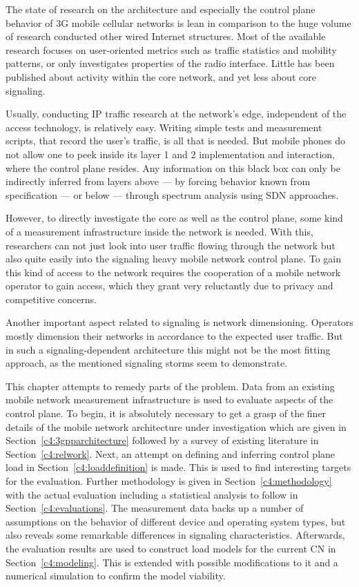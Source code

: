 The state of research on the architecture and especially the control plane behavior of \gls{3G} mobile cellular networks is lean in comparison to the huge volume of research conducted other wired Internet structures. Most of the available research focuses on user-oriented metrics such as traffic statistics and mobility patterns, or only investigates properties of the radio interface. Little has been published about activity within the core network, and yet less about core signaling. 

Usually, conducting \gls{IP} traffic research at the network's edge, independent of the access technology, is relatively easy. Writing simple tests and measurement scripts, that record the user's traffic, is all that is needed. But mobile phones do not allow one to peek inside its layer 1 and 2 implementation and interaction, where the control plane resides. Any information on this black box can only be indirectly inferred from layers above --- by forcing behavior known from specification --- or below --- through spectrum analysis using \gls{SDN} approaches. 

However, to directly investigate the core as well as the control plane, some kind of a measurement infrastructure inside the network is needed. With this, researchers can not just look into user traffic flowing through the network but also quite easily into the signaling heavy mobile network control plane. To gain this kind of access to the network requires the cooperation of a mobile network operator to gain access, which they grant very reluctantly due to privacy and competitive concerns.

Another important aspect related to signaling is network dimensioning. Operators mostly dimension their networks in accordance to the expected user traffic. But in such a signaling-dependent architecture this might not be the most fitting approach, as the mentioned signaling storms seem to demonstrate. 

This chapter attempts to remedy parts of the problem. Data from an existing mobile network measurement infrastructure is used to evaluate aspects of the control plane. 
To begin, it is absolutely necessary to get a grasp of the finer details of the mobile network architecture under investigation which are given in Section~\ref{c4:3gpparchitecture} followed by a survey of existing literature in Section~\ref{c4:relwork}. Next, an attempt on defining and inferring control plane load in Section~\ref{c4:loaddefinition} is made. This is used to find interesting targets for the evaluation.
Further methodology is given in Section~\ref{c4:methodology} with the  actual evaluation including a statistical analysis to follow in Section~\ref{c4:evaluations}. The measurement data backs up a number of assumptions on the behavior of different device and operating system types, but also reveals some remarkable differences in signaling characteristics. Afterwards, the evaluation results are used to construct load models for the current \gls{CN} in Section~\ref{c4:modeling}. This is extended with possible modifications to it and a numerical simulation to confirm the model viability.



